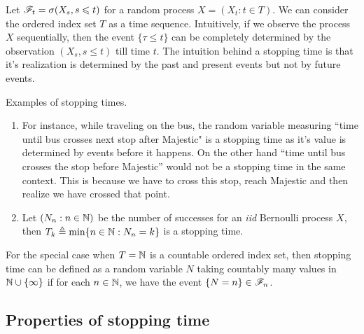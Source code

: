\documentclass[a4paper,10pt,english]{article}
\begin{document}
Let $\mathscr{F}_t = \sigma(X_s, s \leqslant t)$ for a random process $X = (X_t : t \in T)$. 
We can consider the ordered index set $T$ as a time sequence. 
Intuitively, if we observe the process $X$ sequentially, then the event $\{\tau \le t\}$ can be completely determined by the observation $(X_s, s \le t)$ till time $t$. 
The intuition behind a stopping time is that it's realization is determined by the past and present events but not by future events. 
\begin{shaded*}
\begin{exmp} Examples of stopping times.
\begin{enumerate}
\item For instance, while traveling on the bus, the random variable measuring ``time until bus crosses next stop after Majestic" is a stopping time as it's value is determined by events before it happens. 
On the other hand ``time until bus crosses the stop before Majestic'' would not be a stopping time  in the same context. 
This is because we have to cross this stop, reach Majestic and then realize we have crossed that point. 
\item Let $(N_n: n \in \mathbb{N})$ be the number of successes for an \emph{iid} Bernoulli process $X$, then $T_k \triangleq \min\{n \in \mathbb{N}: N_n = k\}$ is a stopping time. 
\end{enumerate}
\end{exmp}
\end{shaded*}
For the special case when $T = \mathbb{N}$ is a countable ordered index set, then stopping time can be defined as a random variable $N$ taking countably many values in $\mathbb{N} \cup \{\infty\}$ if for each $n \in \mathbb{N}$, we have the event $\{N = n\} \in \mathscr{F}_n$.  

\subsection{Properties of stopping time} 
\end{document}
